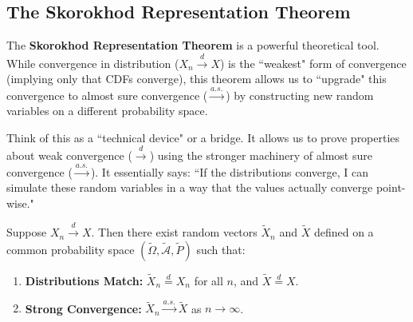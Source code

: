 \subsection*{The Skorokhod Representation Theorem}

The \textbf{Skorokhod Representation Theorem} is a powerful theoretical tool. While convergence in distribution ($X_n \xrightarrow{d} X$) is the ``weakest" form of convergence (implying only that CDFs converge), this theorem allows us to ``upgrade" this convergence to almost sure convergence ($\xrightarrow{a.s.}$) by constructing new random variables on a different probability space.

Think of this as a ``technical device" or a bridge. It allows us to prove properties about weak convergence ($\xrightarrow{d}$) using the stronger machinery of almost sure convergence ($\xrightarrow{a.s.}$). It essentially says: ``If the distributions converge, I can simulate these random variables in a way that the values actually converge point-wise."

\begin{theo}
Suppose $X_n \xrightarrow{d} X$. Then there exist random vectors $\tilde{X}_n$ and $\tilde{X}$ defined on a common probability space $(\tilde{\Omega}, \tilde{\mathcal{A}}, \tilde{P})$ such that:
\begin{enumerate}
    \item \textbf{Distributions Match:} $\tilde{X}_n \stackrel{d}{=} X_n$ for all $n$, and $\tilde{X} \stackrel{d}{=} X$.
    \item \textbf{Strong Convergence:} $\tilde{X}_n \xrightarrow{a.s.} \tilde{X}$ as $n \to \infty$.
\end{enumerate}
\end{theo}

